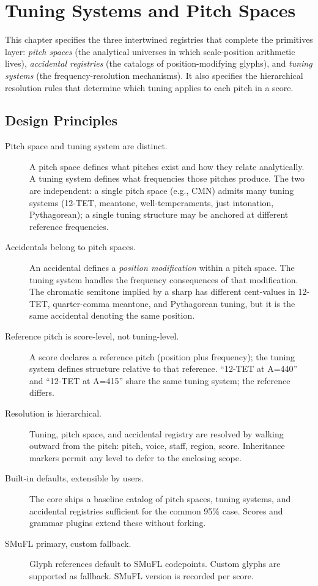 \documentclass[11pt,letterpaper]{report}
\begin{document}
\chapter{Tuning Systems and Pitch Spaces}
\label{ch:tuning}

This chapter specifies the three intertwined registries that complete
the primitives layer: \emph{pitch spaces} (the analytical universes in
which scale-position arithmetic lives), \emph{accidental registries}
(the catalogs of position-modifying glyphs), and \emph{tuning systems}
(the frequency-resolution mechanisms). It also specifies the
hierarchical resolution rules that determine which tuning applies to
each pitch in a score.

\section{Design Principles}
\label{sec:tuning:principles}

\begin{description}
  \item[Pitch space and tuning system are distinct.] A pitch space
    defines what pitches exist and how they relate analytically. A
    tuning system defines what frequencies those pitches produce.
    The two are independent: a single pitch space (e.g., CMN) admits
    many tuning systems (12-TET, meantone, well-temperaments, just
    intonation, Pythagorean); a single tuning structure may be anchored
    at different reference frequencies.
  \item[Accidentals belong to pitch spaces.] An accidental defines a
    \emph{position modification} within a pitch space. The tuning system
    handles the frequency consequences of that modification. The chromatic
    semitone implied by a sharp has different cent-values in 12-TET,
    quarter-comma meantone, and Pythagorean tuning, but it is the same
    accidental denoting the same position.
  \item[Reference pitch is score-level, not tuning-level.] A score
    declares a reference pitch (position plus frequency); the tuning
    system defines structure relative to that reference. ``12-TET at
    A=440'' and ``12-TET at A=415'' share the same tuning system; the
    reference differs.
  \item[Resolution is hierarchical.] Tuning, pitch space, and accidental
    registry are resolved by walking outward from the pitch: pitch,
    voice, staff, region, score. Inheritance markers permit any level
    to defer to the enclosing scope.
  \item[Built-in defaults, extensible by users.] The core ships a
    baseline catalog of pitch spaces, tuning systems, and accidental
    registries sufficient for the common 95\% case. Scores and grammar
    plugins extend these without forking.
  \item[SMuFL primary, custom fallback.] Glyph references default to
    SMuFL codepoints. Custom glyphs are supported as fallback. SMuFL
    version is recorded per score.
\end{description}
\end{document}
